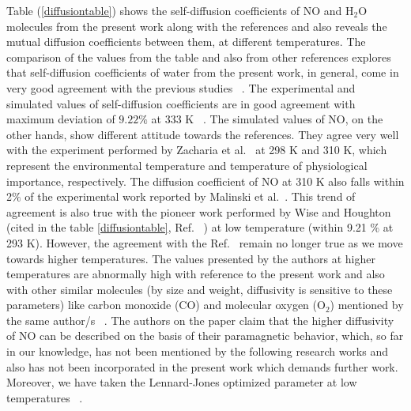 Table (\ref{diffusiontable}) shows the self-diffusion coefficients of NO and H$_\mathrm{2}$O molecules from the present work along with the references and also reveals the mutual diffusion coefficients between them, at different temperatures. The comparison of the values from the table and also from other references explores that self-diffusion coefficients of water from the present work, in general,
come in very good agreement with the previous studies~ \citep{easteal1989diaphragm, Thapa2013, Poudyal2014, zacharia2005diffusivity}. The experimental and simulated values of self-diffusion coefficients are in good agreement with maximum  deviation of $9.22\%$  at 
333 K~ \citep{easteal1989diaphragm}. The simulated values of NO, on the other hands, show different attitude towards the references. They agree very well with the experiment performed by Zacharia et al.~\citep{zacharia2005diffusivity} at 298 K and 310 K, which represent the environmental temperature
and temperature of physiological importance, respectively. The diffusion coefficient of NO at 310 K also falls within 2$\%$ of the experimental work reported by Malinski et al.~\citep{malinski1993diffusion}. This trend of agreement is also true with the pioneer work performed by Wise and Houghton (cited in the table \ref{diffusiontable}, Ref.~ \citep{wise1968diffusion}) at low temperature (within 9.21 $\%$ at 293 K). However, the agreement with the Ref.~ \citep{wise1968diffusion} remain no  longer true as we move towards higher temperatures. The values presented by the authors at higher temperatures are abnormally high with reference to the present work and also with other similar molecules (by size and weight, diffusivity is sensitive to these parameters) like carbon monoxide (CO) and molecular 
oxygen (O$_\mathrm{2}$) mentioned by the same author/s~ \citep{wise1968diffusion, wise1966diffusion}. The authors on the paper claim that the higher diffusivity of NO can be described on the basis of their paramagnetic behavior, which, so far in our knowledge, has not been mentioned
by the following research works and also has not been incorporated in the present work which demands further work. Moreover, we have taken the Lennard-Jones optimized parameter at low temperatures~ \citep{zacharia2005diffusivity}.

